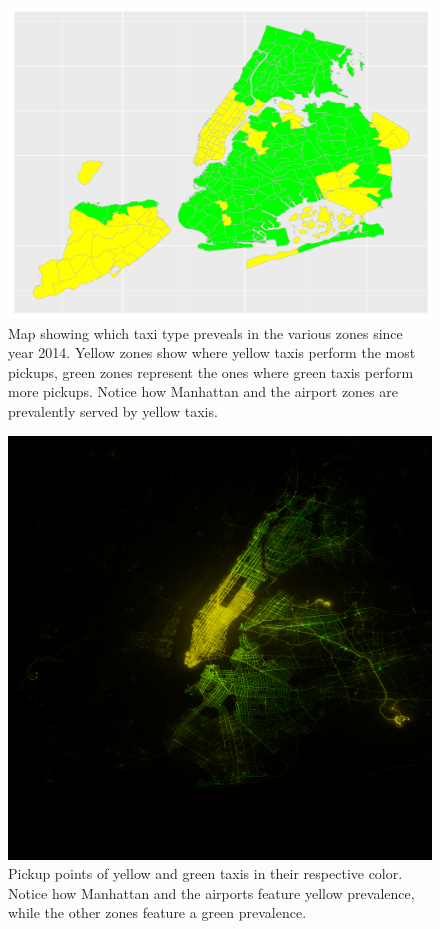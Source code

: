 \documentclass{acm_proc_article-sp-sigmod09}
\begin{document}
\begin{figure}
	\centering
	\includegraphics[width=1\columnwidth]{resources/base_plots/pickup_location_by_company_after_2014_distr_difference_map.pdf}
	\caption{Map showing which taxi type preveals in the various zones since year 2014. Yellow zones show where yellow taxis perform the most pickups, green zones represent the ones where green taxis perform more pickups. Notice how Manhattan and the airport zones are prevalently served by yellow taxis.}
	\label{fig:companyDivisionMap}
\end{figure}
\begin{figure}
	\centering
	\includegraphics[width=1\columnwidth]{resources/base_plots/yellow_vs_green_pickup.png}
	\caption{Pickup points of yellow and green taxis in their respective color. Notice how Manhattan and the airports feature yellow prevalence, while the other zones feature a green prevalence.}
	\label{fig:companyDivisionImageMap}
\end{figure}
\end{document}
